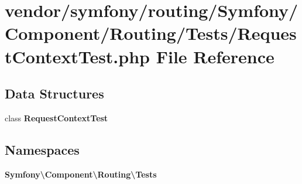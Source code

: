 \section{vendor/symfony/routing/\+Symfony/\+Component/\+Routing/\+Tests/\+Request\+Context\+Test.php File Reference}
\label{_request_context_test_8php}
\subsection*{Data Structures}
\begin{DoxyCompactItemize}
\item 
class {\bf Request\+Context\+Test}
\end{DoxyCompactItemize}
\subsection*{Namespaces}
\begin{DoxyCompactItemize}
\item 
 {\bf Symfony\textbackslash{}\+Component\textbackslash{}\+Routing\textbackslash{}\+Tests}
\end{DoxyCompactItemize}
